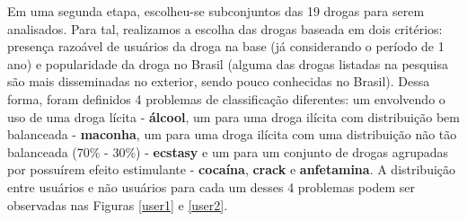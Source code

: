 \documentclass[
	article,			%
	11pt,				%
	oneside,			%
	a4paper,			%
	english,			%
	brazil,				%
	sumario=tradicional
	]{abntex2}
\begin{document}
Em uma segunda etapa, escolheu-se subconjuntos das 19 drogas para serem analisados. Para tal, realizamos a escolha das drogas baseada em dois critérios: presença razoável de usuários da droga na base (já considerando o período de 1 ano) e popularidade da droga no Brasil (alguma das drogas listadas na pesquisa são mais disseminadas no exterior, sendo pouco conhecidas no Brasil). Dessa forma, foram definidos 4 problemas de classificação diferentes: um envolvendo o uso de uma droga lícita - \textbf{álcool}, um para uma droga ilícita com distribuição bem balanceada - \textbf{maconha}, um para uma droga ilícita com uma distribuição não tão balanceada (70\% - 30\%) - \textbf{ecstasy} e um para um conjunto de drogas agrupadas por possuírem efeito estimulante - \textbf{cocaína}, \textbf{crack} e \textbf{anfetamina}. A distribuição entre usuários e não usuários para cada um desses 4 problemas podem ser observadas nas Figuras \ref{user1} e \ref{user2}.
\end{document}
